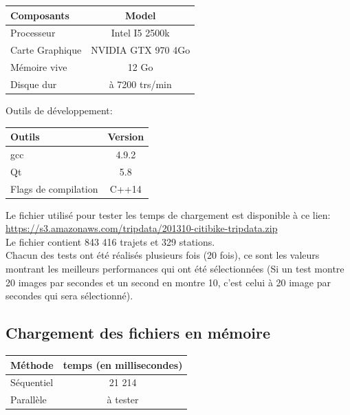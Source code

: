 \documentclass[12pt]{article}
\begin{document}
		\begin{center}
			\begin{tabular}{| l | c |}
			\hline
			\textbf{Composants} & \textbf{Model} \\ \hline
			Processeur & Intel I5 2500k \\ \hline
			Carte Graphique & NVIDIA GTX 970 4Go \\ \hline
			Mémoire vive & 12 Go \\ \hline
			Disque dur & à 7200 trs/min \\ \hline
		    \end{tabular}
	    \end{center}
	    
	    Outils de développement: \\
	    \begin{center}
			\begin{tabular}{| l | c |}
			\hline
			\textbf{Outils} & \textbf{Version} \\ \hline
			gcc & 4.9.2 \\ \hline
			Qt & 5.8 \\ \hline
			Flags de compilation & C++14\\ \hline
		    \end{tabular}
	    \end{center}
	    
	    Le fichier utilisé pour tester les temps de chargement est disponible à ce lien:\\
		\url{https://s3.amazonaws.com/tripdata/201310-citibike-tripdata.zip}\\
		
		Le fichier contient 843 416 trajets et 329 stations. \\
		
		Chacun des tests ont été réalisés plusieurs fois (20 fois), ce
		sont les valeurs montrant les meilleurs performances qui ont été
		sélectionnées (Si un test montre 20 images par secondes et un second en montre
		10, c'est celui à 20 image par secondes qui sera sélectionné).
	    
		\subsection{Chargement des fichiers en mémoire}		
		\begin{center}
			\begin{tabular}{| l | c |}
			\hline
			\textbf{Méthode} & \textbf{temps (en millisecondes)} \\ \hline
			Séquentiel & 21 214 \\ \hline
			Parallèle & à tester \\ \hline
		    \end{tabular}
	    \end{center}
		
\end{document}
